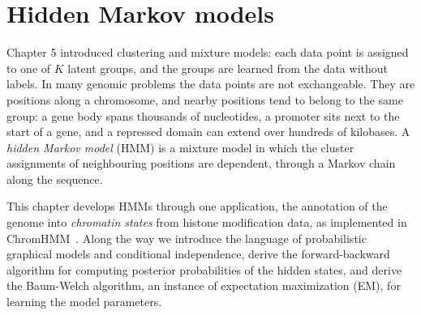 
\providecommand{\R}{\mathbb{R}}
\providecommand{\E}{\mathbb{E}}
\providecommand{\Normal}{\mathcal{N}}
\providecommand{\argmax}{\operatorname*{arg\,max}}
\providecommand{\argmin}{\operatorname*{arg\,min}}
\providecommand{\vy}{\mathbf{y}}
\providecommand{\vx}{\mathbf{x}}
\providecommand{\mX}{\mathbf{X}}
\providecommand{\mI}{\mathbf{I}}
\providecommand{\vb}{\boldsymbol{\beta}}
\providecommand{\veps}{\boldsymbol{\epsilon}}
\providecommand{\vp}{\mathbf{p}}
\providecommand{\vg}{\mathbf{g}}
\providecommand{\ind}{\mathbf{1}}
\providecommand{\mY}{\mathbf{Y}}
\providecommand{\mT}{\mathbf{T}}
\providecommand{\mE}{\mathbf{E}}
\providecommand{\mC}{\mathbf{C}}
\providecommand{\mD}{\mathbf{D}}
\providecommand{\vpi}{\boldsymbol{\pi}}
\providecommand{\vphi}{\boldsymbol{\phi}}
\providecommand{\vgamma}{\boldsymbol{\gamma}}
\providecommand{\vtheta}{\boldsymbol{\theta}}
\providecommand{\vf}{\mathbf{f}}
\providecommand{\vr}{\mathbf{r}}
\providecommand{\vbw}{\mathbf{b}}
\providecommand{\vone}{\mathbf{1}}
\providecommand{\indep}{\perp\!\!\!\perp}
\providecommand{\KL}{\mathrm{KL}}

\providecommand{\chaptertoc}{}
\chapter{Hidden Markov models}
\label{ch:hmm}
\chaptertoc

Chapter 5 introduced clustering and mixture models: each data point is assigned to one of $K$ latent groups, and the groups are learned from the data without labels. In many genomic problems the data points are not exchangeable. They are positions along a chromosome, and nearby positions tend to belong to the same group: a gene body spans thousands of nucleotides, a promoter sits next to the start of a gene, and a repressed domain can extend over hundreds of kilobases. A \emph{hidden Markov model} (HMM) is a mixture model in which the cluster assignments of neighbouring positions are dependent, through a Markov chain along the sequence.

This chapter develops HMMs through one application, the annotation of the genome into \emph{chromatin states} from histone modification data, as implemented in ChromHMM~\citep{ernst2010,ernst2012}. Along the way we introduce the language of probabilistic graphical models and conditional independence, derive the forward-backward algorithm for computing posterior probabilities of the hidden states, and derive the Baum-Welch algorithm, an instance of expectation maximization (EM), for learning the model parameters.

